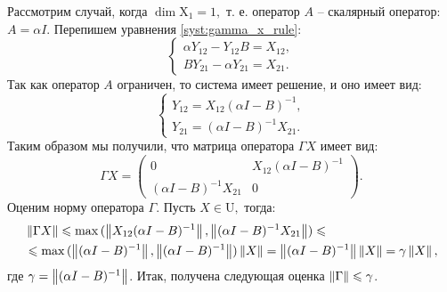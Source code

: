 Рассмотрим случай, когда $\operatorname{dim}\mathrm{X}_1 = 1,$ т.\! е. оператор $A$ -- скалярный оператор: $A = \alpha I$. Перепишем уравнения \eqref{syst:gamma_x_rule}:
$$
	\begin{cases}
		\alpha Y_{12} - Y_{12}B = X_{12}, \\
		BY_{21} - \alpha Y_{21} = X_{21}.
	\end{cases}
$$
Так как оператор $A$ ограничен, то система имеет решение, и оно имеет вид:
$$
	\begin{cases}
		Y_{12} = X_{12}(\alpha I - B)^{-1}, \\
		Y_{21} = (\alpha I - B)^{-1}X_{21}.
	\end{cases}
$$
Таким образом мы получили, что матрица оператора $\Gamma X$ имеет вид:
$$
	\Gamma X = \begin{pmatrix}
		0 & X_{12}(\alpha I - B)^{-1} \\
		(\alpha I - B)^{-1}X_{21} & 0
	\end{pmatrix}.
$$
Оценим норму оператора $\Gamma.$ Пусть $X \in \mathrm{U},$ тогда:
\begin{align*}
&\left\|\Gamma X\right\| \leqslant \max{(\left\|X_{12}(\alpha I - B)^{-1}\right\|, \left\|(\alpha I - B)^{-1}X_{21}\right\|)} \leqslant \\ 
&\leqslant \max{(\left\|(\alpha I - B)^{-1}\right\|, \left\|(\alpha I - B)^{-1}\right\|)}\left\|X\right\| = \left\|(\alpha I - B)^{-1}\right\|\left\|X\right\| = \gamma \left\|X\right\|,
\end{align*}  
где $\gamma = \left\|(\alpha I - B)^{-1}\right\|$.
Итак, получена следующая оценка $\left\|\Gamma\right\| \leqslant \gamma$.
